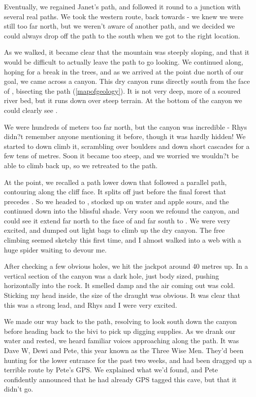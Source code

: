     Eventually, we regained Janet's path, and followed it round to a junction with several real paths. We took the western route, back towards  - we knew we were still too far north, but we weren't aware of another path, and we decided we could always drop off the path to the south when we got to the right location.

    As we walked, it became clear that the mountain was steeply sloping, and that it would be difficult to actually leave the path to go looking. We continued along, hoping for a break in the trees, and as we arrived at the point due north of our goal, we came across a canyon. This dry canyon runs directly south from the face of ,  bisecting the path (\vref{mapofgeology}). It is not very deep, more of a scoured river bed, but it runs down over steep terrain. At the bottom of the canyon we could clearly see .

    We were hundreds of meters too far north, but the canyon was incredible - Rhys didn?t remember anyone mentioning it before, though it was hardly hidden! We started to down climb it, scrambling over boulders and down short cascades for a few tens of metres. Soon it became too steep, and we worried we wouldn?t be able to climb back up, so we retreated to the path.

    At the point, we recalled a path lower down that followed a parallel path, contouring along the cliff face. It splits off just before the final forest that precedes . So we headed to , stocked up on water and apple sours, and the continued down into the blissful shade. Very soon we refound the canyon, and could see it extend far north to the face of  and far south to . We were very excited, and dumped out light bags to climb up the dry canyon. The free climbing seemed sketchy this first time, and I almost walked into a web with a huge spider waiting to devour me. 

    After checking a few obvious holes, we hit the jackpot around 40 metres up. In a vertical section of the canyon was a dark hole, just body sized, pushing horizontally into the rock. It smelled damp and the air coming out was cold. Sticking my head inside, the size of the draught was obvious. It was clear that this was a strong lead, and Rhys and I were very excited.

    We made our way back to the path, resolving to look south down the canyon before heading back to the bivi to pick up digging supplies. As we drank our water and rested, we heard familiar voices approaching along the path. It was Dave W, Dewi and Pete, this year known as the Three Wise Men. They'd been hunting for the lower entrance for the past two weeks, and had been dragged up a terrible route by Pete's GPS. We explained what we'd found, and Pete confidently announced that he had already GPS tagged this cave, but that it didn't go.

